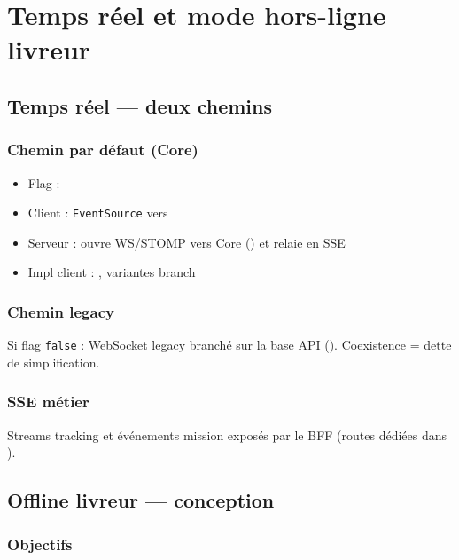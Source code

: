 \chapter{Temps réel et mode hors-ligne livreur}

\section{Temps réel --- deux chemins}

\subsection{Chemin par défaut (Core)}

\begin{itemize}
  \item Flag : 
  \item Client : \texttt{EventSource} vers
  \item Serveur :  ouvre WS/STOMP vers Core
        () et relaie en SSE
  \item Impl client : , variantes branch
\end{itemize}

\subsection{Chemin legacy}

Si flag \texttt{false} : WebSocket legacy branché sur la base API
(). Coexistence = dette de simplification.

\subsection{SSE métier}

Streams tracking et événements mission exposés par le BFF (routes dédiées dans
).

\section{Offline livreur --- conception}

\subsection{Objectifs}

